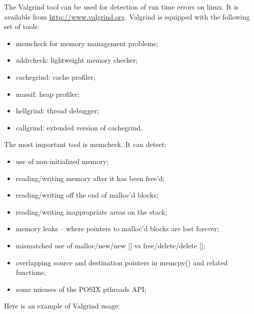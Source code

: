 \documentclass[12pt,a4paper,twoside]{article}
\begin{document}
The Valgrind tool can be used for detection of run time errors on
linux. It is available from \url{http://www.valgrind.org}.  Valgrind
is equipped with the following set of tools:
\begin{itemize}
\item memcheck for memory management problems;
\item addrcheck: lightweight memory checker;
\item cachegrind: cache profiler;
\item massif: heap profiler;
\item hellgrind: thread debugger;
\item callgrind: extended version of cachegrind.
\end{itemize}

The most important tool is memcheck. It can detect:
\begin{itemize}
\item use of non-initialized memory;
\item reading/writing memory after it has been free'd;
\item reading/writing off the end of malloc'd blocks;
\item reading/writing inappropriate areas on the stack;
\item memory leaks -- where pointers to malloc'd blocks are lost forever;
\item mismatched use of malloc/new/new [] vs free/delete/delete [];
\item overlapping source and destination pointers in memcpy() and
  related functions;
\item some misuses of the POSIX pthreads API;
\end{itemize}

Here is an example of Valgrind  usage:

\begin{lstlisting}[language=sh]
  % valgrind --tool=addrcheck --error-limit=no ilcroot -b -q sim.C
\end{lstlisting}

%
\end{document}
